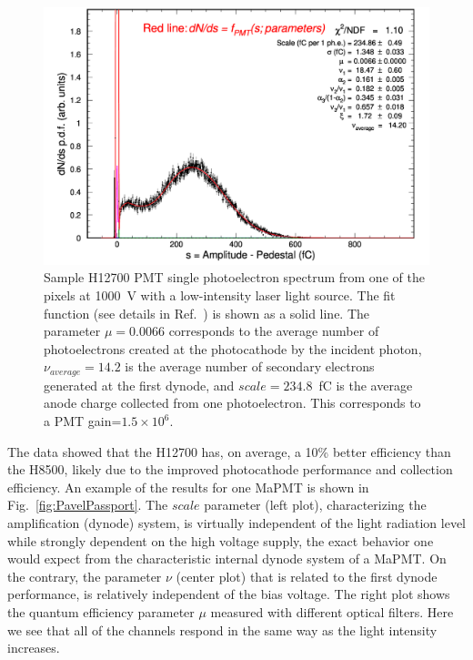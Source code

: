 \documentclass[5p,times,twocolumn]{elsarticle}
\begin{document}
\begin{figure}[ht]
	\centering
	\includegraphics[width=\linewidth]{H12700-r-W0-GA0982-w3-g064-v1000-t227-37.pdf}
	\caption{Sample H12700 PMT single photoelectron spectrum from one of the pixels at 1000~V with a low-intensity
          laser light source. The fit function (see details in Ref.~\cite{Pavel}) is shown as a solid line. The parameter
          $\mu=0.0066$ corresponds to the average number of photoelectrons created at the photocathode by the
          incident photon, $\nu_{average}=14.2$ is the average number of secondary electrons generated at the first
          dynode, and $scale=234.8$~fC is the average anode charge collected from one photoelectron. This corresponds
          to a PMT gain=$1.5 \times 10^6$.}
	\label{fig:SPEH12700}
\end{figure}

The data showed that the H12700 has, on average, a 10\% better efficiency than the H8500, likely due to the improved
photocathode performance and collection efficiency. An example of the results for one MaPMT is shown in
Fig.~\ref{fig:PavelPassport}. The $scale$ parameter (left plot), characterizing the amplification (dynode) system, is
virtually independent of the light radiation level while strongly dependent on the high voltage supply, the exact behavior
one would expect from the characteristic internal dynode system of a MaPMT. On the contrary, the parameter $\nu$
(center plot) that is related to the first dynode performance, is relatively independent of the bias voltage. The right
plot shows the quantum efficiency parameter $\mu$ measured with different optical filters. Here we see that all of
the channels respond in the same way as the light intensity increases.
\end{document}
